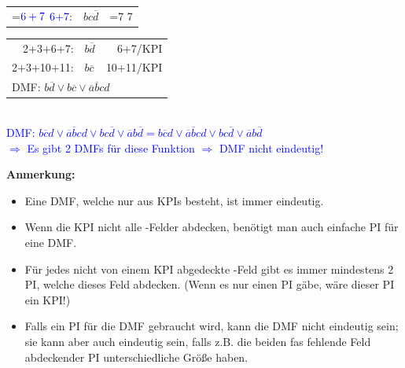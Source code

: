 \documentclass[10pt,a4paper]{scrartcl}
\newcommand\hcancel[2][black]{\setbox0=\hbox{$#2$}%
	\rlap{\raisebox{.45\ht0}{\textcolor{#1}{\rule{\wd0}{1pt}}}}#2}
\begin{document}
\begin{table}[h!]
\begin{tabular}{rlr}
		\hcancel[green!80!black]{\textcolor{blue}{6+7}}: & $ bc\overline{d} $ & \hcancel[green!80!black]7
	\end{tabular}
{\color{green!80!black}
	\begin{tabular}{rlr}
	2+3+6+7: & $ b \overline{d} $ & 6+7/\ac{KPI}\\
	2+3+10+11: & $ b \overline{c} $ & 10+11/\ac{KPI}\\
	\multicolumn{3}{l}{DMF: $ b \overline{d} \vee b \overline{c} \vee \overline{a} \overline{b}cd $}
	\end{tabular}
}
\\
\flushleft
\textcolor{blue}{DMF: $ b \overline{c}d \vee \overline{a} \overline{b} cd \vee bc\overline{d} \vee \overline{a} b \overline{d} = b\overline{c} d \vee \overline{a} \overline{b} c d \vee b c \overline{d} \vee \overline{a} b \overline{d}$}\\
\textcolor{blue}{$\Rightarrow$ Es gibt 2 \ac{DMF}s für diese Funktion $\Rightarrow$ \ac{DMF} nicht eindeutig!}
\end{table}

\textbf{Anmerkung:} 
\begin{itemize}
	\item Eine \ac{DMF}, welche nur aus \acp{KPI} besteht, ist immer eindeutig.
	\item Wenn die \ac{KPI} nicht alle \grqq-Felder abdecken, benötigt man auch einfache \ac{PI} für eine \ac{DMF}.
	\item Für jedes nicht von einem \ac{KPI} abgedeckte \grqq-Feld gibt es immer mindestens 2 \ac{PI}, welche dieses Feld abdecken. (Wenn es nur einen \ac{PI} gäbe, wäre dieser \ac{PI} ein \ac{KPI}!)
	\item Falls ein \ac{PI} für die \ac{DMF} gebraucht wird, kann die \ac{DMF} nicht eindeutig sein; sie kann aber auch eindeutig sein, falls z.B. die beiden fas fehlende Feld abdeckender \ac{PI} unterschiedliche Größe haben.
\end{itemize}
\end{document}
